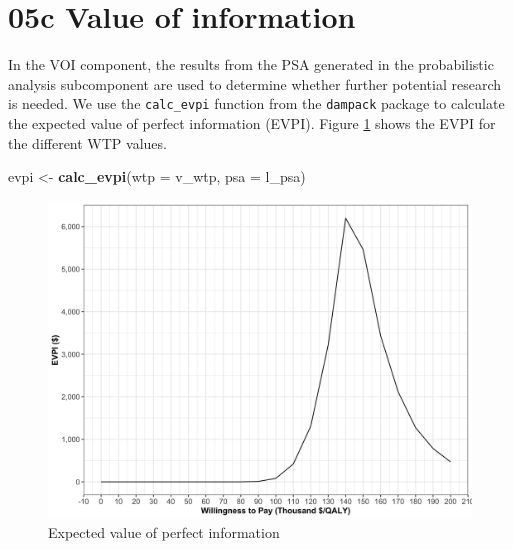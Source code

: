 \documentclass[]{book}
\newenvironment{Shaded}{\begin{snugshade}}{\end{snugshade}}
\newcommand{\KeywordTok}[1]{\textcolor[rgb]{0.13,0.29,0.53}{\textbf{#1}}}
\newcommand{\DataTypeTok}[1]{\textcolor[rgb]{0.13,0.29,0.53}{#1}}
\newcommand{\StringTok}[1]{\textcolor[rgb]{0.31,0.60,0.02}{#1}}
\newcommand{\NormalTok}[1]{#1}
\begin{document}
\section{05c Value of information}\label{voi}

In the VOI component, the results from the PSA generated in the
probabilistic analysis subcomponent are used to determine whether
further potential research is needed. We use the \texttt{calc\_evpi}
function from the \texttt{dampack} package to calculate the expected
value of perfect information (EVPI). Figure \ref{fig:05c-evpi} shows the
EVPI for the different WTP values.

\begin{Shaded}
\begin{Highlighting}[]
\NormalTok{evpi <-}\StringTok{ }\KeywordTok{calc_evpi}\NormalTok{(}\DataTypeTok{wtp =}\NormalTok{ v_wtp, }\DataTypeTok{psa =}\NormalTok{ l_psa)}
\end{Highlighting}
\end{Shaded}

\begin{figure}

{\centering \includegraphics[width=1\linewidth]{../figs/05c_evpi} 

}

\caption{Expected value of perfect information}\label{fig:05c-evpi}
\end{figure}


\end{document}
